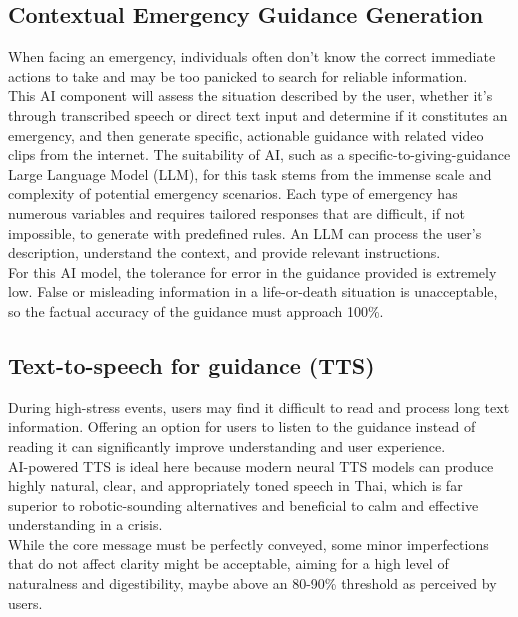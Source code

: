 \subsection{Contextual Emergency Guidance Generation}
\label{subsec:ai_comp_guidance_generation}
When facing an emergency, individuals often don't know the correct immediate actions to take and may be too panicked to search for reliable information.\\
\indent This AI component will assess the situation described by the user, whether it’s through transcribed speech or direct text input and determine if it constitutes an emergency, and then generate specific, actionable guidance with related video clips from the internet. The suitability of AI, such as a specific-to-giving-guidance Large Language Model (LLM), for this task stems from the immense scale and complexity of potential emergency scenarios. Each type of emergency has numerous variables and requires tailored responses that are difficult, if not impossible, to generate with predefined rules. An LLM can process the user's description, understand the context, and provide relevant instructions.\\
\indent For this AI model, the tolerance for error in the guidance provided is extremely low. False or misleading information in a life-or-death situation is unacceptable, so the factual accuracy of the guidance must approach 100\%.

\subsection{Text-to-speech for guidance (TTS)}
\label{subsec:ai_comp_tts}
During high-stress events, users may find it difficult to read and process long text information. Offering an option for users to listen to the guidance instead of reading it can significantly improve understanding and user experience.\\
\indent AI-powered TTS is ideal here because modern neural TTS models can produce highly natural, clear, and appropriately toned speech in Thai, which is far superior to robotic-sounding alternatives and beneficial to calm and effective understanding in a crisis.\\
\indent While the core message must be perfectly conveyed, some minor imperfections that do not affect clarity might be acceptable, aiming for a high level of naturalness and digestibility, maybe above an 80-90\% threshold as perceived by users.

